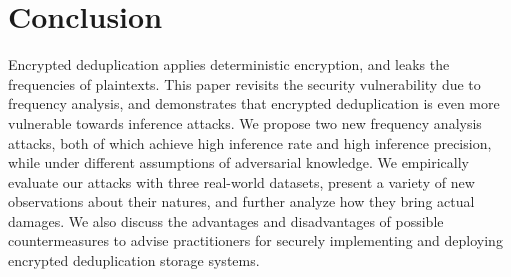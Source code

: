 \documentclass[bachelor]{thesis-uestc}
\begin{document}





\chapter{Conclusion}
\label{sec:conclusion}

Encrypted deduplication applies deterministic encryption, and leaks the frequencies of plaintexts. This paper revisits the security vulnerability  due to frequency analysis, and demonstrates that encrypted deduplication is even more vulnerable towards inference attacks. We propose two new frequency analysis attacks, both of which  achieve high inference rate and high inference precision, while under different assumptions of adversarial knowledge. We empirically evaluate our attacks with three real-world datasets, present a variety of new observations about their natures, and further analyze how they bring actual damages. We also discuss the advantages and disadvantages of possible countermeasures to advise practitioners for securely implementing and deploying encrypted deduplication storage systems. 
\end{document}
